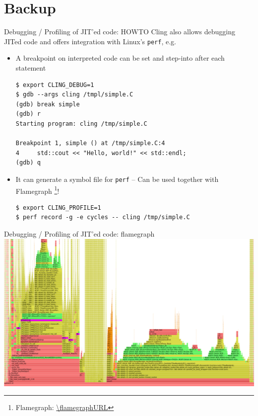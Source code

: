 \section*{Backup}

\begin{frame}[fragile]{Debugging / Profiling of JIT'ed code: HOWTO}
  Cling also allows debugging JITed code and offers integration with Linux's \texttt{perf}, e.g.
  \vfill

  \begin{itemize}
  \item A breakpoint on interpreted code can be set and step-into after each statement
    \begin{lstlisting}[style=bash]
$ export CLING_DEBUG=1
$ gdb --args cling /tmpl/simple.C
(gdb) break simple
(gdb) r
Starting program: cling /tmp/simple.C

Breakpoint 1, simple () at /tmp/simple.C:4
4	  std::cout << "Hello, world!" << std::endl;
(gdb) q
    \end{lstlisting}

  \item It can generate a symbol file for \texttt{perf} -- Can be used together with Flamegraph%
    \footnote{Flamegraph: \url{\flamegraphURL}}!
    \begin{lstlisting}[style=bash]
$ export CLING_PROFILE=1
$ perf record -g -e cycles -- cling /tmp/simple.C
    \end{lstlisting}
  \end{itemize}
\end{frame}

\begin{frame}{Debugging / Profiling of JIT'ed code: flamegraph}
  \includegraphics[width=\textwidth]{img/flamegraph-df102py3.12.png}
\end{frame}
